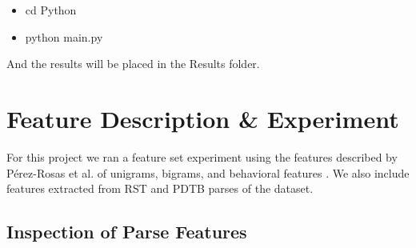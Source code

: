 \documentclass[12pt]{article}
\begin{document}
\begin{itemize}
\item cd Python
\item python main.py
\end{itemize}

And the results will be placed in the Results folder.

\section{Feature Description \& Experiment}
For this project we ran a feature set experiment using the features described by
P\'{e}rez-Rosas et al. of unigrams, bigrams, and behavioral features
\cite{perez-rosasDeceptionDetectionUsing2015}. We also include features
extracted from RST and PDTB parses of the dataset.

\subsection{Inspection of Parse Features}
\end{document}
